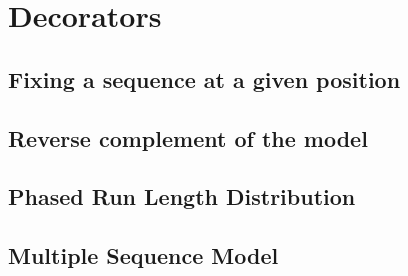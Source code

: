 \chapter{Decorators}

\section{Fixing a sequence at a given position}

\section{Reverse complement of the model}

\section{Phased Run Length Distribution}

\section{Multiple Sequence Model}
